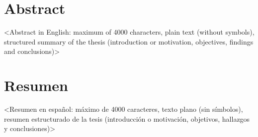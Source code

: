 %

\section*{Abstract}
\label{sec::abstract}

<Abstract in English: maximum of 4000 characters, plain text (without symbols), structured summary of the thesis (introduction or motivation, objectives, findings and conclusions)>


\newpage
\section*{Resumen}
\label{sec::resumen}


<Resumen en español: máximo de 4000 caracteres, texto plano (sin símbolos), resumen estructurado de la tesis (introducción o motivación, objetivos, hallazgos y conclusiones)>



